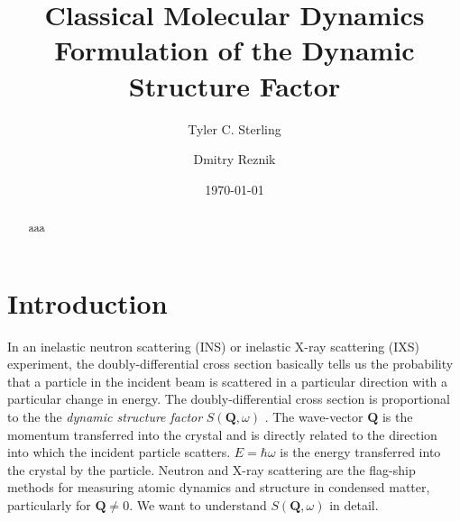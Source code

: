 \documentclass[11pt,prb,aps,nofootinbib,superscriptaddress,floatfix]{revtex4-2}
\begin{document}
\title{Classical Molecular Dynamics Formulation of the Dynamic Structure Factor}

\author{Tyler C. Sterling}

\author{Dmitry Reznik}


\date{\today}

\begin{abstract}
aaa
\end{abstract}

\maketitle

\section{Introduction}
In an inelastic neutron scattering (INS) or inelastic X-ray scattering (IXS) experiment, the doubly-differential cross section basically tells us the probability that a particle in the incident beam is scattered in a particular direction with a particular change in energy. The doubly-differential cross section is proportional to the the \emph{dynamic structure factor} $S(\bm{Q},\omega)$ \cite{dove1993introduction,squires1996introduction}. The wave-vector $\bm{Q}$ is the momentum transferred into the crystal and is directly related to the direction into which the incident particle scatters. $E=\hbar \omega$ is the energy transferred into the crystal by the particle. Neutron and X-ray scattering are the flag-ship methods for measuring atomic dynamics and structure in condensed matter, particularly for $\bm{Q} \neq 0$. We want to understand $S(\bm{Q},\omega)$ in detail. 
\end{document}
